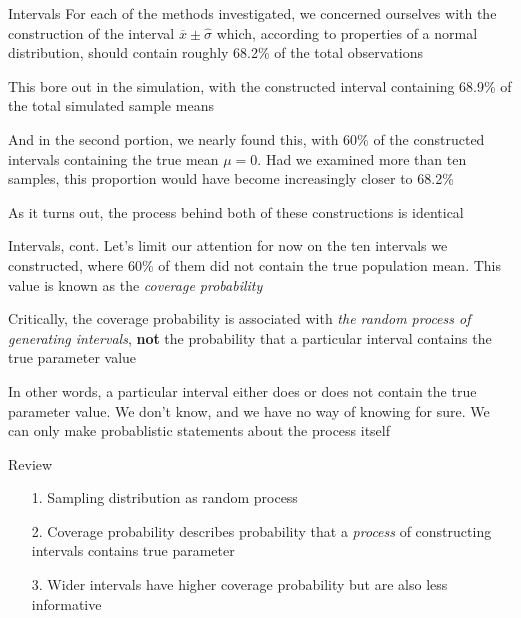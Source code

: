\documentclass{beamer}
\begin{document}
\begin{frame}{Intervals}
For each of the methods investigated, we concerned ourselves with the construction of the interval $\overline{x} \pm \hat{\sigma}$ which, according to properties of a normal distribution, should contain roughly 68.2\% of the total observations \\ \vspace{3mm}

This bore out in the simulation, with the constructed interval containing 68.9\% of the total simulated sample means \\ \vspace{3mm}

And in the second portion, we nearly found this, with 60\% of the constructed intervals containing the true mean $\mu = 0$. Had we examined more than ten samples, this proportion would have become increasingly closer to 68.2\% \\ \vspace{3mm}

As it turns out, the process behind both of these constructions is identical
\end{frame}

\begin{frame}{Intervals, cont.}
Let's limit our attention for now on the ten intervals we constructed, where 60\% of them did not contain the true population mean. This value is known as the \textit{coverage probability} \\ \vspace{5mm}

Critically, the coverage probability is associated with \textit{the random process of generating intervals}, \textbf{not} the probability that a particular interval contains the true parameter value \\ \vspace{3mm}

In other words, a particular interval either does or does not contain the true parameter value. We don't know, and we have no way of knowing for sure. We can only make probablistic statements about the process itself

\end{frame}



\begin{frame}{Review}
\begin{itemize}
  \item[1.] Sampling distribution as random process
  \item[2.] Coverage probability describes probability that a \textit{process} of constructing intervals contains true parameter
  \item[3.] Wider intervals have higher coverage probability but are also less informative
\end{itemize}
\end{frame}





\end{document}

